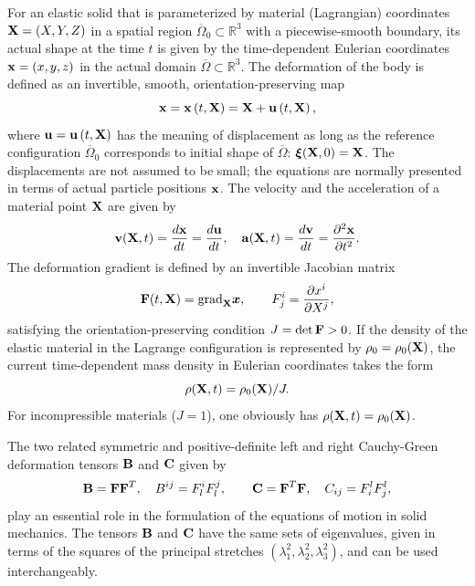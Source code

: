 \documentclass[11pt,letter,subeqn,fleqn]{article}
\numberwithin{equation}{section}
\numberwithin{table}{section}
\numberwithin{figure}{section}
\def\beq{\begin{equation}}
\def\eeq{\end{equation}}
\def\const{\hbox{\rm const}}
\def\vec#1{{\boldsymbol{\rm #1}}} %
\def\tens#1{{\boldsymbol{\rm #1}}} %
\def\vec#1{{\boldsymbol{\rm #1}}} %
\def\tens#1{{\boldsymbol{\rm #1}}} %
\begin{document}
For an elastic solid that is parameterized by material (Lagrangian) coordinates $\vec{X}=(X, Y, Z)$ in a spatial region $\overline{\Omega}_{0}\subset \mathbb{R}^{3}$  with a piecewise-smooth boundary, its actual shape at the time $t$ is given by the time-dependent Eulerian coordinates $\vec{x}=(x, y, z)$ in the actual domain $\overline{\Omega}\subset \mathbb{R}^{3}$. The deformation of the body is defined as an invertible, smooth, orientation-preserving map
\begin{equation}\label{eq:Matcoord}
\vec{x}=\vec{x} \left(t,\vec{X}\right)=\vec{X}+\vec{u}\left(t,\vec{X}\right),
\end{equation}
where $\vec{u}=\vec{u}\left(t,\vec{X}\right)$ has the meaning of displacement as long as the reference configuration $\overline{\Omega}_{0}$ corresponds to initial shape of $\overline{\Omega}$: $\vec{\xi}(\vec{X},0)=\vec{X}$. The displacements are not assumed to be small; the equations are normally presented in terms of actual particle positions $\vec{x}$. The velocity and the acceleration of a material point $\vec{X}$ are given by
\[
\vec{v}(\vec{X},t)=\frac{d\vec{x}}{dt}=\frac{d\vec{u}}{dt}, \quad \vec{a}(\vec{X},t)=\frac{d\vec{v}}{dt}=\frac{\partial ^{2}\vec{x}}{\partial t^{2}}.
\]
The deformation gradient is defined by an invertible Jacobian matrix
\begin{equation}{\label{eq:ch15a}}
\vec{F}(t,\vec{X})=\mathrm{grad}_{\vec{X}}\boldsymbol{x}, \qquad F^i_{j} = \frac{\partial x^i}{\partial X^j},
\end{equation}
satisfying the orientation-preserving condition $\displaystyle J=\mathrm{det}\,\vec{F}>0$. If the density of the elastic material in the Lagrange configuration is represented by $\rho_0=\rho_0(\vec{X})$, the current time-dependent mass density in Eulerian coordinates takes the form
\[
\rho(\vec{X},t)=\rho_0(\vec{X})/J.
\]
For incompressible materials ($J=1$), one obviously has $\rho(\vec{X},t)=\rho_0(\vec{X})$.



The two related symmetric and positive-definite left and right Cauchy-Green deformation tensors $\tens{B}$ and $\vec{C}$ given by
\beq\label{eq:BC}
\tens{B} = \tens{F}\tens{F}^T,\quad {B}^{ij}=F^{i}_{l}F^{j}_{l} ,\qquad \tens{C} = \tens{F}^T\tens{F}, \quad {C}_{ij}=F^{l}_{i}F^{l}_{j},
\eeq
play an essential role in the formulation of the equations of motion in solid mechanics. The tensors  $\tens{B}$ and $\tens{C}$ have the same sets of eigenvalues, given in terms of the squares of the principal stretches $\left(\lambda^{2}_{1},\lambda^{2}_{2},\lambda^{2}_{3}\right)$, and can be used interchangeably.
\end{document}
